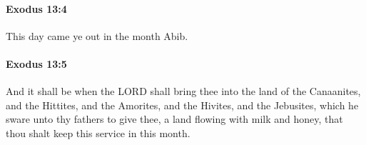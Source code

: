 		\paragraph{Exodus 13:4} %
			\label{EXODUS-13-4}

			This day came ye out in the month Abib.


		\paragraph{Exodus 13:5} %
			\label{EXODUS-13-5}

			And it shall be when the LORD shall bring thee into the land of the Canaanites, and the Hittites, and the Amorites, and the Hivites, and the Jebusites, which he sware unto thy fathers to give thee, a land flowing with milk and honey, that thou shalt keep this service in this month.


